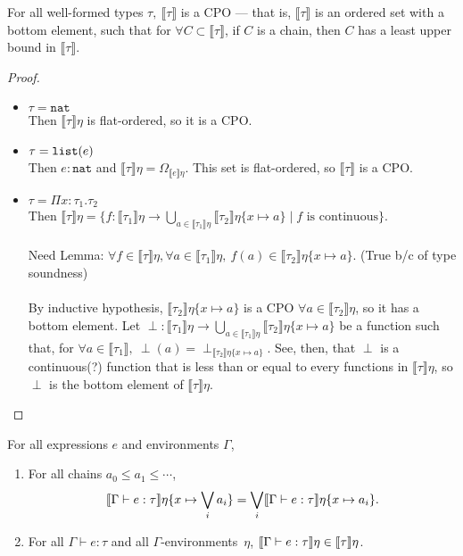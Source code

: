  \begin{thm}
For all well-formed types $\tau, \ \llbracket \tau \rrbracket$ is a CPO --- that is, $\llbracket \tau \rrbracket$ is an ordered 
set with a bottom element, such that for $\forall C \subset \llbracket \tau \rrbracket$, if  $C$ is a chain, then $C$ has a 
least upper bound in $\llbracket \tau \rrbracket$. \\
\end{thm}
\begin{proof} 
\begin{itemize}
\item $\tau = \texttt{nat}$ \\
Then $\llbracket \tau \rrbracket\eta$ is flat-ordered, so it is a CPO.
\item $\tau = \texttt{list}(e)$ \\
Then $e : \texttt{nat}$ and $\llbracket \tau \rrbracket\eta = \Omega_{\llbracket e \rrbracket\eta}$. This set is flat-ordered,
so $\llbracket \tau \rrbracket$ is a CPO.
\item $\tau = \Pi x:\tau_1.\tau_2$ \\
Then $\llbracket \tau \rrbracket\eta =  \{f: \llbracket \tau_1 \rrbracket\eta \rightarrow 
 \bigcup_{a \in \llbracket \tau_1 \rrbracket\eta} \llbracket \tau_2 \rrbracket\eta\{x \mapsto a\}
 \mid f \text{ is continuous}\}$.  \\ \\
 Need Lemma: $\forall f \in \llbracket \tau \rrbracket\eta, \forall a \in \llbracket \tau_1 \rrbracket\eta, \
 f(a) \in \llbracket \tau_2 \rrbracket\eta\{x \mapsto a \}$. (True b/c of type soundness)  \\ \\
 By inductive hypothesis, $\llbracket \tau_2 \rrbracket\eta\{x\mapsto a\}$ is a CPO
 $\forall a \in \llbracket \tau_2 \rrbracket\eta$, so it has a bottom element. 
 Let $\perp : \llbracket \tau_1 \rrbracket\eta \rightarrow 
 \bigcup_{a \in \llbracket \tau_1 \rrbracket\eta} \llbracket \tau_2 \rrbracket\eta\{x \mapsto a\}$ be a function such that, for 
 $\forall a \in \llbracket \tau_1 \rrbracket, \ \perp(a) = \perp_{\llbracket \tau_2 \rrbracket\eta\{x\mapsto a\}}$. See, then,
 that $\perp$ is a continuous(?) function that is less than or equal to every functions in $\llbracket \tau \rrbracket\eta$,
 so $\perp$ is the bottom element of $\llbracket \tau \rrbracket\eta$.
\end{itemize}
\end{proof}

\begin{thm} 
For all expressions $e$ and environments $\Gamma$,
\begin{enumerate}
\item For all chains $a_0\leq a_1\leq\dotsb$,
\begin{align*}
\llbracket{{\Gamma}\vdash{e}:{\tau}}\rrbracket{\eta\{{x}\mapsto{\bigvee_i a_i}\}} =
\bigvee_i\llbracket{{\Gamma}\vdash{e}:{\tau}}\rrbracket{\eta\{{x}\mapsto{a_i}\}}.
\end{align*}
\item For all $\Gamma\vdash e : \tau$ and all $\Gamma$-environments~$\eta$,
$\llbracket{{\Gamma}\vdash{e}:{\tau}}\rrbracket{\eta}\in\llbracket{\tau}\rrbracket\eta$.
\end{enumerate}
\end{thm}

